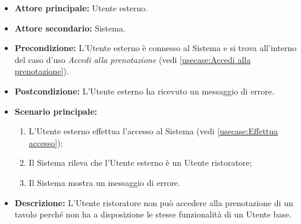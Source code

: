 \label{usecase:Errore utente ristoratore}
\begin{itemize}
	\item \textbf{Attore principale:} Utente esterno.
	\item \textbf{Attore secondario:} Sistema.
	\item \textbf{Precondizione:} L'Utente esterno è connesso al Sistema e si
	      trova all'interno del caso d'uso \textit{Accedi alla prenotazione} (vedi
	      \autoref{usecase:Accedi alla prenotazione}).

	\item \textbf{Postcondizione:} L'Utente esterno ha ricevuto un messaggio di
	      errore.
	\item \textbf{Scenario principale:}
	      \begin{enumerate}
		      \item L'Utente esterno effettua l'accesso al Sistema 
				  (vedi \autoref{usecase:Effettua accesso});
		      \item Il Sistema rileva che l'Utente esterno è un Utente ristoratore;
		      \item Il Sistema mostra un messaggio di errore.
	      \end{enumerate}

	\item \textbf{Descrizione:}
	      L'Utente ristoratore non può accedere alla prenotazione di un tavolo
	      perché non ha a disposizione le stesse funzionalità di un Utente base.
\end{itemize}
